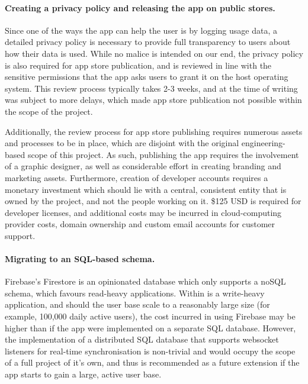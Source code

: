 \paragraph{Creating a privacy policy and releasing the app on public stores.} Since one of the ways the app can help the user is by logging usage data, a detailed privacy policy is necessary to provide full transparency to users about how their data is used. While no malice is intended on our end, the privacy policy is also required for app store publication, and is reviewed in line with the sensitive permissions that the app asks users to grant it on the host operating system. This review process typically takes 2-3 weeks, and at the time of writing was subject to more delays, which made app store publication not possible within the scope of the project.

Additionally, the review process for app store publishing requires numerous assets and processes to be in place, which are disjoint with the original engineering-based scope of this project. As such, publishing the app requires the involvement of a graphic designer, as well as considerable effort in creating branding and marketing assets. Furthermore, creation of developer accounts requires a monetary investment which should lie with a central, consistent entity that is owned by the project, and not the people working on it. \$125 USD is required for developer licenses, and additional costs may be incurred in cloud-computing provider costs, domain ownership and custom email accounts for customer support.

\paragraph{Migrating to an SQL-based schema.} Firebase's Firestore is an opinionated database which only supports a noSQL schema, which favours read-heavy applications. Within is a write-heavy application, and should the user base scale to a reasonably large size (for example, 100,000 daily active users), the cost incurred in using Firebase may be higher than if the app were implemented on a separate SQL database. However, the implementation of a distributed SQL database that supports websocket listeners for real-time synchronisation is non-trivial and would occupy the scope of a full project of it's own, and thus is recommended as a future extension if the app starts to gain a large, active user base.

